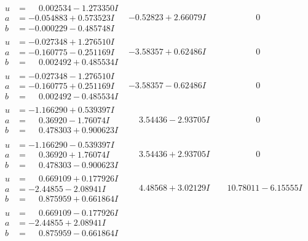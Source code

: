 \documentclass[1p]{elsarticle_modified}
\theoremstyle{definition}
\begin{document}
$$\begin{array}{c|c|c}
\begin{aligned}
u &= \phantom{-}0.002534 - 1.273350 I \\
a &= -0.054883 + 0.573523 I \\
b &= -0.000229 - 0.485748 I\end{aligned}
 & -0.52823 + 2.66079 I & \phantom{-0.000000 } 0 \\ \hline\begin{aligned}
u &= -0.027348 + 1.276510 I \\
a &= -0.160775 - 0.251169 I \\
b &= \phantom{-}0.002492 + 0.485534 I\end{aligned}
 & -3.58357 + 0.62486 I & \phantom{-0.000000 } 0 \\ \hline\begin{aligned}
u &= -0.027348 - 1.276510 I \\
a &= -0.160775 + 0.251169 I \\
b &= \phantom{-}0.002492 - 0.485534 I\end{aligned}
 & -3.58357 - 0.62486 I & \phantom{-0.000000 } 0 \\ \hline\begin{aligned}
u &= -1.166290 + 0.539397 I \\
a &= \phantom{-}0.36920 - 1.76074 I \\
b &= \phantom{-}0.478303 + 0.900623 I\end{aligned}
 & \phantom{-}3.54436 - 2.93705 I & \phantom{-0.000000 } 0 \\ \hline\begin{aligned}
u &= -1.166290 - 0.539397 I \\
a &= \phantom{-}0.36920 + 1.76074 I \\
b &= \phantom{-}0.478303 - 0.900623 I\end{aligned}
 & \phantom{-}3.54436 + 2.93705 I & \phantom{-0.000000 } 0 \\ \hline\begin{aligned}
u &= \phantom{-}0.669109 + 0.177926 I \\
a &= -2.44855 - 2.08941 I \\
b &= \phantom{-}0.875959 + 0.661864 I\end{aligned}
 & \phantom{-}4.48568 + 3.02129 I & \phantom{-}10.78011 - 6.15555 I \\ \hline\begin{aligned}
u &= \phantom{-}0.669109 - 0.177926 I \\
a &= -2.44855 + 2.08941 I \\
b &= \phantom{-}0.875959 - 0.661864 I\end{aligned}

\end{array}$$
\end{document}
